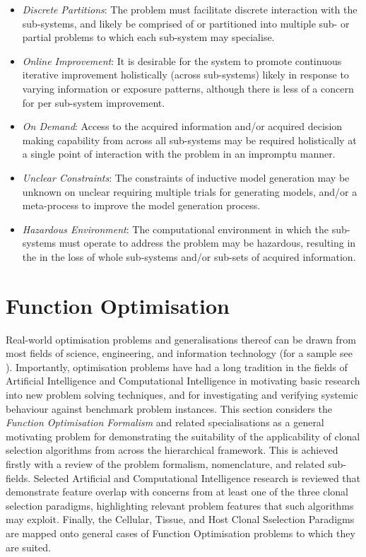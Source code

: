 \begin{itemize}
	\item \emph{Discrete Partitions}: The problem must facilitate discrete interaction with the sub-systems, and likely be comprised of or partitioned into multiple sub- or partial problems to which each sub-system may specialise. 
	\item \emph{Online Improvement}: It is desirable for the system to promote continuous iterative improvement holistically (across sub-systems) likely in response to varying information or exposure patterns, although there is less of a concern for per sub-system improvement.
	\item \emph{On Demand}: Access to the acquired information and/or acquired decision making capability from across all sub-systems may be required holistically at a single point of interaction with the problem in an impromptu manner.
	\item \emph{Unclear Constraints}: The constraints of inductive model generation may be unknown on unclear requiring multiple trials for generating models, and/or a meta-process to improve the model generation process.
	\item \emph{Hazardous Environment}: The computational environment in which the sub-systems must operate to address the problem may be hazardous, resulting in the in the loss of whole sub-systems and/or sub-sets of acquired information.	
\end{itemize}


% 
%
\section{Function Optimisation}
\label{sec:iidle:function:optimization}
Real-world optimisation problems and generalisations thereof can be drawn from most fields of science, engineering, and information technology (for a sample see \cite{Ali1997, Toern1999}). Importantly, optimisation problems have had a long tradition in the fields of Artificial Intelligence and Computational Intelligence in motivating basic research into new problem solving techniques, and for investigating and verifying systemic behaviour against benchmark problem instances.
This section considers the \emph{Function Optimisation Formalism} and related specialisations as a general motivating problem for demonstrating the suitability of the applicability of clonal selection algorithms from across the hierarchical framework.
This is achieved firstly with a review of the problem formalism, nomenclature, and related sub-fields. Selected Artificial and Computational Intelligence research is reviewed that demonstrate feature overlap with concerns from at least one of the three clonal selection paradigms, highlighting relevant problem features that such algorithms may exploit. Finally, the Cellular, Tissue, and Host Clonal Sselection Paradigms are mapped onto general cases of Function Optimisation problems to which they are suited.

